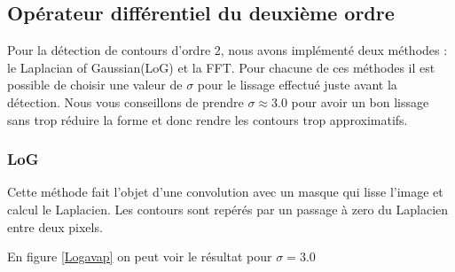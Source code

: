 \documentclass[paper=a4, fontsize=11pt]{scrartcl} %
\begin{document}
\begin{figure} [h!]
\end{figure}

\newpage

\subsection{Opérateur différentiel du deuxième ordre}
Pour la détection de contours d'ordre 2, nous avons implémenté deux méthodes : le Laplacian of Gaussian(LoG) et la FFT. Pour chacune de ces méthodes il est possible de choisir une valeur de $\sigma$ pour le lissage effectué juste avant la détection. Nous vous conseillons de prendre $\sigma \approx 3.0$ pour avoir un bon lissage sans trop réduire la forme et donc rendre les contours trop approximatifs.

\subsubsection{LoG}
Cette méthode fait l'objet d'une convolution avec un masque qui lisse l'image et calcul le Laplacien. Les contours sont repérés par un passage à zero du Laplacien entre deux pixels.

En figure \ref{Logavap} on peut voir le résultat pour $\sigma=3.0$
\end{document}
